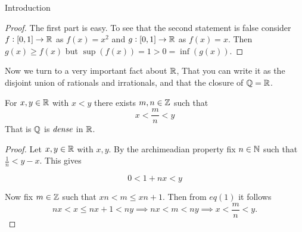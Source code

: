 \begin{chapter}{Introduction}
    
    \begin{proof}
        The first part is easy. To see that the second statement is false consider $f:[0,1] \to \mathbb{R}$ as $f(x) = x^2$ and 
        $g: [0, 1] \to \mathbb{R}$ as $f(x) = x$. Then $g(x) \geq f(x)$ but $\sup(f(x)) = 1 > 0 = \inf(g(x))$. 
    \end{proof}


    Now we turn to a very important fact about $\mathbb{R}$, That you can write it as the disjoint union of rationals and irrationals, and 
    that the closure of $\mathbb{Q} = \mathbb{R}$. 

    
    \begin{thm}
        For $x, y \in \mathbb{R}$ with $x < y$ there exists $m, n \in \mathbb{Z}$ such that 
        \[x < \frac{m}{n} < y\]
        That is $\mathbb{Q}$ is $\emph{dense}$ in $\mathbb{R}$. 
    \end{thm}

    
    \begin{proof}
        Let $x, y \in \mathbb{R}$ with $x , y$. By the archimeadian property fix $n \in \mathbb{N}$ such that $\frac{1}{n} < y - x$. This gives 
        
        \[0 < 1 + nx < y \] 

        Now fix $m \in \mathbb{Z}$ such that $xn < m \leq xn + 1$. Then from $eq(1)$ it follows 
        \[nx< x \leq nx + 1 < ny \implies nx < m < ny \implies x < \frac{m}{n} < y. \]

    \end{proof}


\end{chapter}